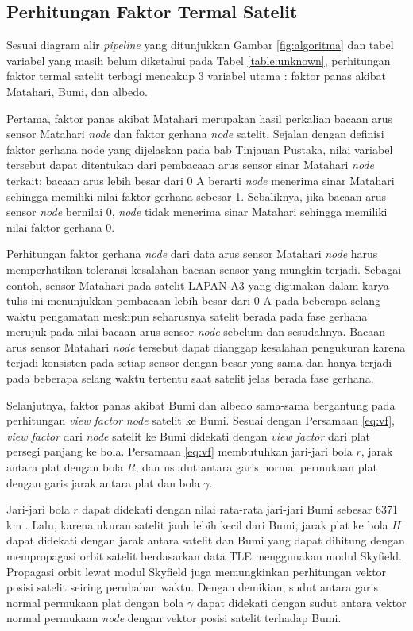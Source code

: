\subsection{Perhitungan Faktor Termal Satelit}

Sesuai diagram alir \textit{pipeline} yang ditunjukkan Gambar \ref{fig:algoritma}
dan tabel variabel yang masih belum diketahui pada Tabel \ref{table:unknown},
perhitungan faktor termal satelit terbagi mencakup 3 variabel utama : faktor
panas akibat Matahari, Bumi, dan albedo.

Pertama, faktor panas akibat Matahari merupakan hasil perkalian bacaan arus
sensor Matahari \textit{node} dan faktor gerhana \textit{node} satelit. Sejalan
dengan definisi faktor gerhana node yang dijelaskan pada bab Tinjauan Pustaka,
nilai variabel tersebut dapat ditentukan dari pembacaan arus sensor sinar
Matahari \textit{node} terkait; bacaan arus lebih besar dari 0 A berarti
\textit{node} menerima sinar Matahari sehingga memiliki nilai faktor gerhana
sebesar 1. Sebaliknya, jika bacaan arus sensor \textit{node} bernilai 0,
\textit{node} tidak menerima sinar Matahari sehingga memiliki nilai faktor
gerhana 0.

Perhitungan faktor gerhana \textit{node} dari data arus sensor Matahari
\textit{node} harus memperhatikan toleransi kesalahan bacaan sensor yang
mungkin terjadi. Sebagai contoh, sensor Matahari pada satelit LAPAN-A3 yang
digunakan dalam karya tulis ini menunjukkan pembacaan lebih besar dari 0 A pada
beberapa selang waktu pengamatan meskipun seharusnya satelit berada pada fase
gerhana merujuk pada nilai bacaan arus sensor \textit{node} sebelum dan
sesudahnya. Bacaan arus sensor Matahari \textit{node} tersebut dapat dianggap
kesalahan pengukuran karena terjadi konsisten pada setiap sensor dengan besar
yang sama dan hanya terjadi pada beberapa selang waktu tertentu saat satelit
jelas berada fase gerhana. 

Selanjutnya, faktor panas akibat Bumi dan albedo sama-sama bergantung pada
perhitungan \textit{view factor} \textit{node} satelit ke Bumi. Sesuai dengan
Persamaan \ref{eq:vf}, \textit{view factor} dari \textit{node} satelit ke Bumi
didekati dengan \textit{view factor} dari plat persegi panjang ke bola. Persamaan \ref{eq:vf} membutuhkan jari-jari bola $r$, jarak antara plat dengan bola $R$, dan usudut antara garis normal permukaan plat dengan garis jarak antara plat dan bola $\gamma$. 

Jari-jari bola $r$ dapat didekati dengan nilai rata-rata jari-jari Bumi sebesar
6371 km \cite{moritz}. Lalu, karena ukuran satelit jauh lebih kecil dari Bumi,
jarak plat ke bola $H$ dapat didekati dengan jarak antara satelit dan Bumi yang
dapat dihitung dengan mempropagasi orbit satelit berdasarkan data TLE
menggunakan modul Skyfield. Propagasi orbit lewat modul Skyfield juga
memungkinkan perhitungan vektor posisi satelit seiring perubahan waktu. Dengan
demikian, sudut antara garis normal permukaan plat dengan bola $\gamma$ dapat
didekati dengan sudut antara vektor normal permukaan \textit{node} dengan
vektor posisi satelit terhadap Bumi. 

